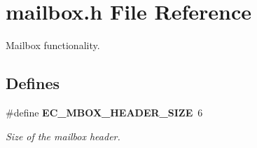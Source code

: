 \section{mailbox.\-h \-File \-Reference}
\label{mailbox_8h}


\-Mailbox functionality.  


\subsection*{\-Defines}
\begin{DoxyCompactItemize}
\item 
\#define {\bf \-E\-C\-\_\-\-M\-B\-O\-X\-\_\-\-H\-E\-A\-D\-E\-R\-\_\-\-S\-I\-Z\-E}~6\label{mailbox_8h_a189582ffd5ea94b41b00482c04968291}

\begin{DoxyCompactList}\small\item\em \-Size of the mailbox header. \end{DoxyCompactList}\end{DoxyCompactItemize}
